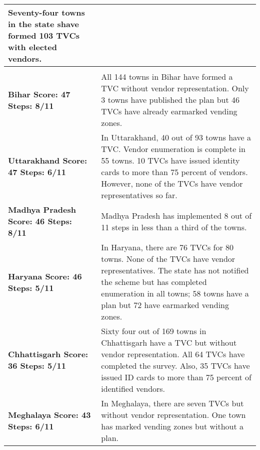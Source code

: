 \documentclass[a4paper, 12pt, twoside]{article}
\begin{document}
\begin{longtable}[l]{>{\raggedright}p{4cm}>{\raggedright\arraybackslash}p{10cm}}
Seventy-four towns in the state shave formed 103 TVCs with elected vendors.
\\
\midrule
\multicolumn{2}{l}{States with Moderate Compliance (Index Score Between 50 to 59)}\\
\midrule
\cellcolor{SVACyellow1}\bf{Bihar}
\newline
\bf{Score: 47}
\newline
\bf{Steps: 8/11}
&
\cellcolor{SVACyellow2}All 144 towns in Bihar have formed a TVC without vendor representation. Only 3 towns have published the plan but 46 TVCs have already earmarked vending zones.
\\
\cellcolor{SVACyellow1}\bf{Uttarakhand}
\newline
\bf{Score: 47}
\newline
\bf{Steps: 6/11}
&
\cellcolor{SVACyellow2}In Uttarakhand, 40 out of 93 towns have a TVC. Vendor enumeration is complete in 55 towns. 10 TVCs have issued identity cards to more than 75 percent of vendors. However, none of the TVCs have vendor representatives so far.
\\
\cellcolor{SVACyellow1}\bf{Madhya Pradesh}
\newline
\bf{Score: 46}
\newline
\bf{Steps: 8/11}
&
\cellcolor{SVACyellow2}Madhya Pradesh has implemented 8 out of 11 steps in less than a third of the towns.
\\
\cellcolor{SVACyellow1}\bf{Haryana}
\newline
\bf{Score: 46}
\newline
\bf{Steps: 5/11}
&
\cellcolor{SVACyellow2}In Haryana, there are 76 TVCs for 80 towns. None of the TVCs have vendor representatives. The state has not notified the scheme but has completed enumeration in all towns; 58 towns have a plan but 72 have earmarked vending zones.
\\
\cellcolor{SVACyellow1}\bf{Chhattisgarh}
\newline
\bf{Score: 36}
\newline
\bf{Steps: 5/11}
&
\cellcolor{SVACyellow2}Sixty four out of 169 towns in Chhattisgarh have a TVC but without vendor representation. All 64 TVCs have completed the survey. Also, 35 TVCs have issued ID cards to more than 75 percent of identified vendors.
\\
\cellcolor{SVACyellow1}\bf{Meghalaya}
\newline
\bf{Score: 43}
\newline
\bf{Steps: 6/11}
&
\cellcolor{SVACyellow2}In Meghalaya, there are seven TVCs but without vendor representation. One town has marked vending zones but without a plan.

\end{longtable}
\end{document}
